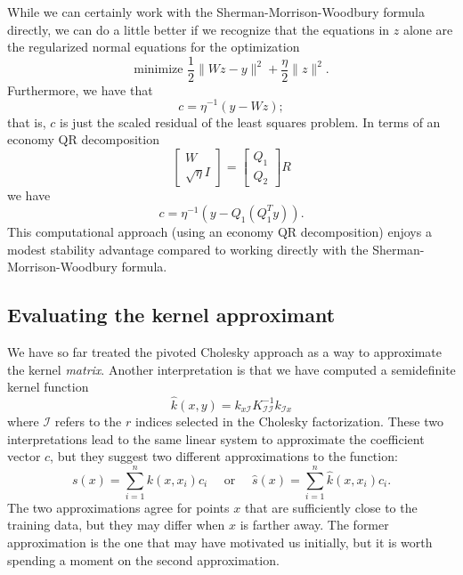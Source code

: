 \documentclass[12pt, leqno]{article} %
\newcommand{\calI}{\mathcal{I}}
\begin{document}
While we can certainly work with the Sherman-Morrison-Woodbury formula
directly, we can do a little better if we recognize that the equations in
$z$ alone are the regularized normal equations for the optimization
\[
  \mbox{minimize } \frac{1}{2} \|W z - y\|^2 + \frac{\eta}{2} \|z\|^2.
\]
Furthermore, we have that
\[
  c = \eta^{-1} (y - W z);
\]
that is, $c$ is just the scaled residual of the least squares problem.
In terms of an economy QR decomposition
\[
  \begin{bmatrix} W \\ \sqrt{\eta} I \end{bmatrix} =
  \begin{bmatrix} Q_1 \\ Q_2 \end{bmatrix} R
\]
we have
\[
  c = \eta^{-1}\left( y - Q_1 (Q_1^T y) \right).
\]
This computational approach (using an economy QR decomposition) enjoys
a modest stability advantage compared to working directly with the
Sherman-Morrison-Woodbury formula.

\subsection{Evaluating the kernel approximant}

We have so far treated the pivoted Cholesky approach as a way to
approximate the kernel {\em matrix}.  Another interpretation is that
we have computed a semidefinite kernel function
\[
  \hat{k}(x,y) = k_{x\calI} K_{\calI \calI}^{-1} k_{\calI x}
\]
where $\calI$ refers to the $r$ indices selected in the Cholesky
factorization.  These two interpretations lead to the same linear
system to approximate the coefficient vector $c$, but they suggest
two different approximations to the function:
\[
  s(x) = \sum_{i=1}^n k(x, x_i) c_i
  \quad \mbox{ or } \quad
  \hat{s}(x) = \sum_{i=1}^n \hat{k}(x, x_i) c_i.
\]
The two approximations agree for points $x$ that are sufficiently
close to the training data, but they may differ when $x$ is farther
away.   The former approximation is the one that may have motivated us
initially, but it is worth spending a moment on the second approximation.
\end{document}
